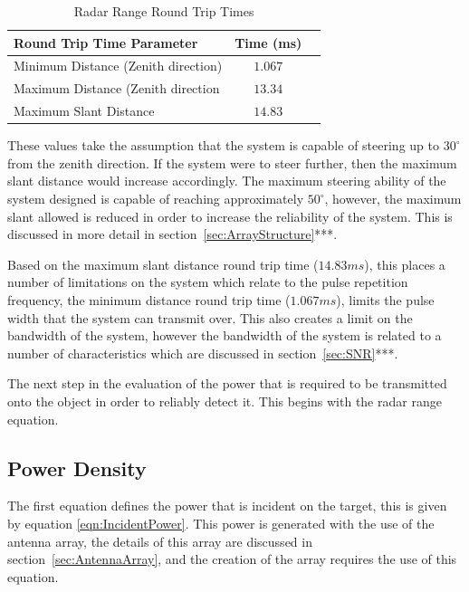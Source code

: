 \documentclass[11pt]{witseiepaper}
\begin{document}
\begin{table}[htb]
    \caption{Radar Range Round Trip Times}
    \label{tab:RadarRangeValues}
    \begin{center}
        \begin{tabular}{p{70mm}cp{70mm}}
            \hline 
            Round Trip Time Parameter & Time (ms) \\
            \hline
            Minimum Distance (Zenith direction) & $1.067$ \\
            Maximum Distance  (Zenith direction & $13.34$ \\
            Maximum Slant Distance & $14.83$ \\
            \hline
        \end{tabular}
    \end{center}
\end{table}
These values take the assumption that the system is capable of steering up to $30^{\circ}$ from the zenith direction. If the system were to steer further, then the maximum slant distance would increase accordingly. The maximum steering ability of the system designed is capable of reaching approximately $50^{\circ}$, however, the maximum slant allowed is reduced in order to increase the reliability of the system. This is discussed in more detail in section~\ref{sec:ArrayStructure}***.

Based on the maximum slant distance round trip time ($14.83 ms$), this places a number of limitations on the system which relate to the pulse repetition frequency, the minimum distance round trip time ($1.067 ms$), limits the pulse width that the system can transmit over. This also creates a limit on the bandwidth of the system, however the bandwidth of the system is related to a number of characteristics which are discussed in section~\ref{sec:SNR}***.


The next step in the evaluation of the power that is required to be transmitted onto the object in order to reliably detect it. This begins with the radar range equation.

\subsection{Power Density} \label{sec:PowerDensity}

The first equation defines the power that is incident on the target, this is given by equation \ref{eqn:IncidentPower}. This power is generated with the use of the antenna array, the details of this array are discussed in section~\ref{sec:AntennaArray}, and the creation of the array requires the use of this equation. 
\end{document}
